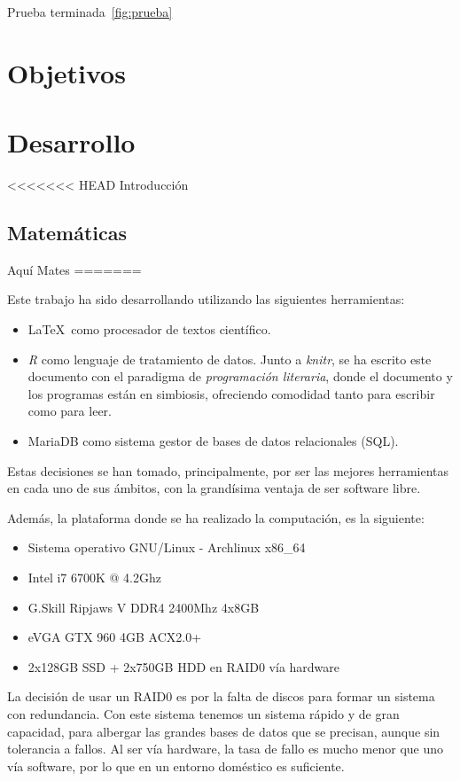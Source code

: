 \documentclass[a4paper,11pt]{book}\usepackage[]{graphicx}\usepackage[]{color}
\theoremstyle{plain}
\theoremstyle{definition}
\begin{document}
Prueba terminada~\ref{fig:prueba}


\chapter{Objetivos} 


\chapter{Desarrollo}


<<<<<<< HEAD
Introducción

\section{Matemáticas}
\label{sec:matematicas}
Aquí Mates
=======

Este trabajo ha sido desarrollando utilizando las siguientes herramientas:

\begin{itemize}
  \item \LaTeX \, como procesador de textos científico.
  \item \emph{R} como lenguaje de tratamiento de datos. Junto a \emph{knitr},
  se ha escrito este documento con el paradigma de \emph{programación literaria},
  donde el documento y los programas están en simbiosis, ofreciendo comodidad
  tanto para escribir como para leer.
  \item MariaDB como sistema gestor de bases de datos relacionales (SQL).
\end{itemize}

Estas decisiones se han tomado, principalmente, por ser las mejores herramientas
en cada uno de sus ámbitos, con la grandísima ventaja de ser software libre.

Además, la plataforma donde se ha realizado la computación, es la siguiente:
\begin{itemize}
  \item Sistema operativo GNU/Linux - Archlinux x86\_64
  \item Intel i7 6700K @ 4.2Ghz
  \item G.Skill Ripjaws V DDR4 2400Mhz 4x8GB
  \item eVGA GTX 960 4GB ACX2.0+
  \item 2x128GB SSD + 2x750GB HDD en RAID0 vía hardware
\end{itemize}

La decisión de usar un RAID0 es por la falta de discos para formar un sistema
con redundancia. Con este sistema tenemos un sistema rápido y de gran capacidad,
para albergar las grandes bases de datos que se precisan, aunque sin tolerancia
a fallos. Al ser vía hardware, la tasa de fallo es mucho menor que uno vía
software, por lo que en un entorno doméstico es suficiente.
\end{document}
